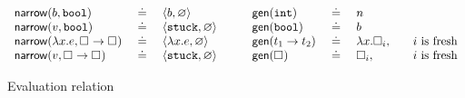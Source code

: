 \begin{figure*}
\[\begin{array}{lcl}
\mathsf{narrow}(b, \mathtt{bool})   & \ \doteq\  & \langle b, \varnothing \rangle \\
\mathsf{narrow}(v, \mathtt{bool})   & \ \doteq\  & \langle \mathtt{stuck}, \varnothing \rangle \\
\mathsf{narrow}(\lambda x. e, {\square_{}} \rightarrow \square_{}) & \ \doteq\  & \langle \lambda x. e, \varnothing \rangle \\
\mathsf{narrow}(v, {\square_{}} \rightarrow \square_{}) & \ \doteq\  & \langle \mathtt{stuck}, \varnothing \rangle \\
\end{array}
\qquad
\begin{array}{lcll}
\mathsf{gen}(\mathtt{int})   & \ \doteq\  & n & \\
\mathsf{gen}(\mathtt{bool})  & \ \doteq\  & b & \\
\mathsf{gen}({t_1} \rightarrow t_2) & \ \doteq\  & \lambda x. \square_{i}, & \quad \text{$i$ is fresh} \\
\mathsf{gen}(\square_{}) & \ \doteq\  & \square_{i}, & \quad \text{$i$ is fresh} \\
\end{array}
\]
\caption{Evaluation relation}
\label{fig:operational}
\end{figure*}
